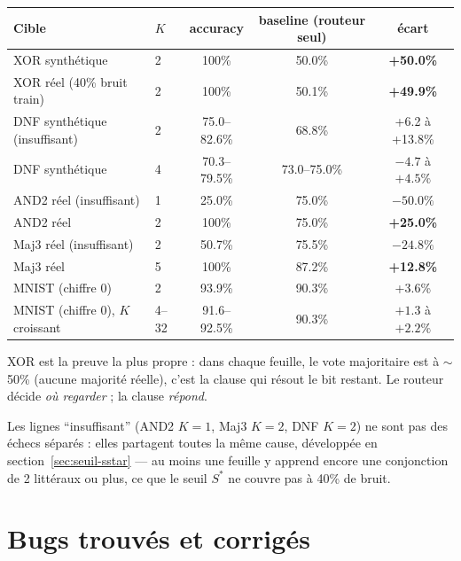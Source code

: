 \documentclass[12pt,a4paper]{article}
\theoremstyle{remark}
\newcommand{\Sstar}{S^{*}}
\begin{document}
\begin{center}
\begin{tabular}{@{}llccc@{}}
\toprule
Cible & $K$ & accuracy & baseline (routeur seul) & écart \\
\midrule
XOR synthétique & 2 & 100\% & 50.0\% & \textbf{+50.0\%} \\
XOR réel (40\% bruit train) & 2 & 100\% & 50.1\% & \textbf{+49.9\%} \\
DNF synthétique (insuffisant) & 2 & 75.0--82.6\% & 68.8\% & +6.2 à +13.8\% \\
DNF synthétique & 4 & 70.3--79.5\% & 73.0--75.0\% & $-4.7$ à $+4.5\%$ \\
AND2 réel (insuffisant) & 1 & 25.0\% & 75.0\% & $\mathbf{-50.0\%}$ \\
AND2 réel & 2 & 100\% & 75.0\% & \textbf{+25.0\%} \\
Maj3 réel (insuffisant) & 2 & 50.7\% & 75.5\% & $\mathbf{-24.8\%}$ \\
Maj3 réel & 5 & 100\% & 87.2\% & \textbf{+12.8\%} \\
MNIST (chiffre 0)\footnotemark & 2 & 93.9\% & 90.3\% & +3.6\% \\
MNIST (chiffre 0), $K$ croissant & 4--32 & 91.6--92.5\% & 90.3\% & $+1.3$ à $+2.2\%$ \\
\bottomrule
\end{tabular}
\end{center}

XOR est la preuve la plus propre : dans chaque feuille, le vote majoritaire
est à $\sim$50\% (aucune majorité réelle), c'est la clause qui résout le bit
restant. Le routeur décide \emph{où regarder} ; la clause \emph{répond}.

Les lignes ``insuffisant'' (AND2 $K=1$, Maj3 $K=2$, DNF $K=2$) ne sont pas
des échecs séparés : elles partagent toutes la même cause, développée en
section~\ref{sec:seuil-sstar} --- au moins une feuille y apprend encore une
conjonction de 2 littéraux ou plus, ce que le seuil $\Sstar$ ne couvre pas à
40\% de bruit.

\section{Bugs trouvés et corrigés}
\end{document}

